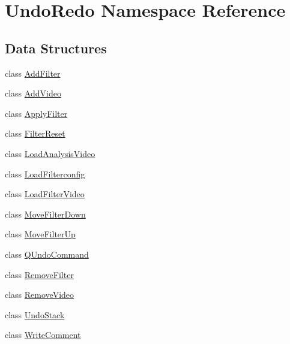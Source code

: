 \hypertarget{namespaceUndoRedo}{}\section{Undo\+Redo Namespace Reference}
\label{namespaceUndoRedo}
\subsection*{Data Structures}
\begin{DoxyCompactItemize}
\item 
class \hyperlink{classUndoRedo_1_1AddFilter}{Add\+Filter}
\item 
class \hyperlink{classUndoRedo_1_1AddVideo}{Add\+Video}
\item 
class \hyperlink{classUndoRedo_1_1ApplyFilter}{Apply\+Filter}
\item 
class \hyperlink{classUndoRedo_1_1FilterReset}{Filter\+Reset}
\item 
class \hyperlink{classUndoRedo_1_1LoadAnalysisVideo}{Load\+Analysis\+Video}
\item 
class \hyperlink{classUndoRedo_1_1LoadFilterconfig}{Load\+Filterconfig}
\item 
class \hyperlink{classUndoRedo_1_1LoadFilterVideo}{Load\+Filter\+Video}
\item 
class \hyperlink{classUndoRedo_1_1MoveFilterDown}{Move\+Filter\+Down}
\item 
class \hyperlink{classUndoRedo_1_1MoveFilterUp}{Move\+Filter\+Up}
\item 
class \hyperlink{classUndoRedo_1_1QUndoCommand}{Q\+Undo\+Command}
\item 
class \hyperlink{classUndoRedo_1_1RemoveFilter}{Remove\+Filter}
\item 
class \hyperlink{classUndoRedo_1_1RemoveVideo}{Remove\+Video}
\item 
class \hyperlink{classUndoRedo_1_1UndoStack}{Undo\+Stack}
\item 
class \hyperlink{classUndoRedo_1_1WriteComment}{Write\+Comment}
\end{DoxyCompactItemize}
